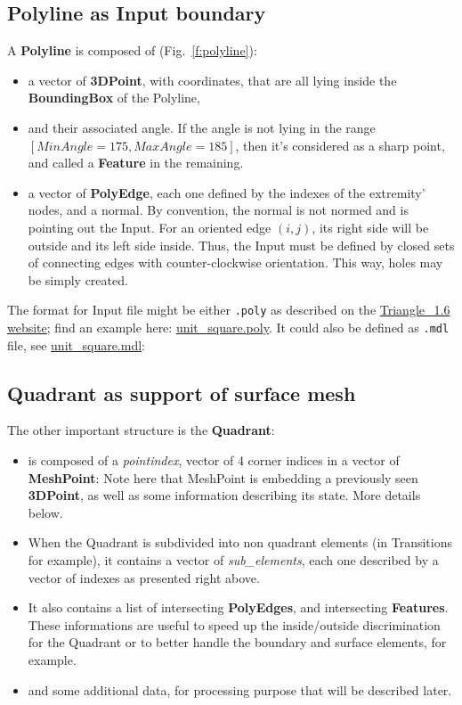 \documentclass[10pt]{article}
\begin{document}
\subsection {Polyline as Input boundary}

A \textbf{Polyline} is composed of (Fig.~\ref{f:polyline}):
\begin{itemize}
\item a vector of  \textbf{3DPoint}, with coordinates, that are all lying inside the \textbf{BoundingBox} of the Polyline,
\item and their associated angle. If the angle is not lying in the range $[MinAngle=175,MaxAngle=185]$, then it's considered as a sharp point, and called  a \textbf{Feature} in the remaining.
\item a vector of \textbf{PolyEdge}, each one defined by the indexes of the extremity' nodes, and a normal. By convention, the normal is not normed and is pointing out the Input. For an oriented edge $(i,j)$, its right side will be outside and its left side inside. Thus, the Input must be defined by closed sets of connecting edges with counter-clockwise orientation. This way, holes may be simply created.
\end{itemize}
The format for Input file might be either \verb?.poly? as described on the \href{https://www.cs.cmu.edu/~quake/triangle.poly.html}{ Triangle\_1.6 website}; find an example here: \href{https://github.com/jaillet/MixedQuadTree/blob/master/data/unit\_square.poly}{unit\_square.poly}.
It could also be defined as \verb?.mdl? file, see \href{https://github.com/jaillet/MixedQuadTree/blob/master/data/unit\_square.mdl}{unit\_square.mdl}:

\subsection{Quadrant as support of surface mesh}

The other important structure is the \textbf{Quadrant}:
\begin{itemize}
\item is composed of a \textit{pointindex}, vector of 4 corner indices in a vector of \textbf{MeshPoint}: Note here that MeshPoint is embedding a previously seen \textbf{3DPoint}, as well as some information describing its state. More details below.
\item When the Quadrant is subdivided into non quadrant elements (in Transitions for example), it contains a vector of \textit{sub\_elements}, each one described by a vector of indexes as presented right above.
\item It also contains a list of intersecting \textbf{PolyEdges}, and intersecting \textbf{Features}. These informations are useful to speed up the inside/outside discrimination for the Quadrant or to better handle the boundary and surface elements, for example.
\item and some additional data, for processing purpose that will be described later.
\end{itemize}
\end{document}
